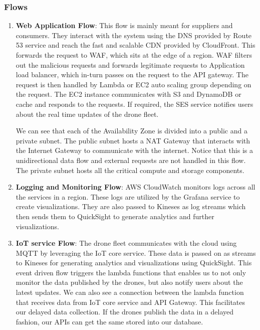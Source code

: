 \documentclass{article}
\begin{document}
\subsubsection{Flows}
\begin{enumerate}
    \item \textbf{Web Application Flow}:
    This flow is mainly meant for suppliers and consumers. They interact with the system using the DNS provided by Route 53 service and reach the fast and scalable CDN provided by CloudFront. This forwards the request to WAF, which sits at the edge of a region. WAF filters out the malicious requests and forwards legitimate requests to Application load balancer, which in-turn passes on the request to the API gateway. The request is then handled by Lambda or EC2 auto scaling group depending on the request. The EC2 instance communicates with S3 and DynamoDB or cache and responds to the requests. If required, the SES service notifies users about the real time updates of the drone fleet. 

    We can see that each of the Availability Zone is divided into a public and a private subnet. The public subnet hosts a NAT Gateway that interacts with the Internet Gateway to communicate with the internet. Notice that this is a unidirectional data flow and external requests are not handled in this flow. The private subnet hosts all the critical compute and storage components.  
    
    \item \textbf{Logging and Monitoring Flow}:
    AWS CloudWatch monitors logs across all the services in a region. These logs are utilized by the Grafana service to create visualizations. They are also passed to Kineses as log streams which then sends them to QuickSight to generate analytics and further visualizations. 
    \item \textbf{IoT service Flow}: \label{iot_flow}
    The drone fleet communicates with the cloud using MQTT by leveraging the IoT core service. These data is passed on as streams to Kineses for generating analytics and visualizations using QuickSight. This event driven flow triggers the lambda functions that enables us to not only monitor the data published by the drones, but also notify users about the latest updates. 
    We can also see a connection between the lambda function that receives data from IoT core service and API Gateway. This facilitates our delayed data collection. If the drones publish the data in a delayed fashion, our APIs can get the same stored into our database. 
\end{enumerate}
\end{document}
